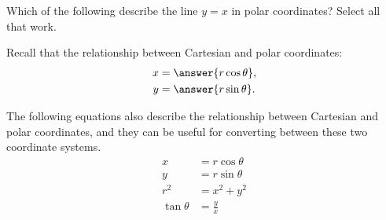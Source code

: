 \documentclass{ximera}
\begin{document}
\begin{example}
Which of the following describe the line $y=x$ in polar coordinates? Select all that work.
\begin{selectAll}
\end{selectAll}

\end{example}

Recall that the relationship between Cartesian and polar coordinates:
\begin{align*}
x &= \answer{r\cos\theta},\\
y &= \answer{r\sin\theta}.
\end{align*}

The following equations also describe the relationship between Cartesian and polar coordinates, and they can be useful for converting between these two coordinate systems.
\begin{align*}
x &= r\cos\theta\\
y &= r\sin\theta\\
r^2 &= x^2 +y^2\\
\tan\theta &= \frac{y}{x}
\end{align*}
\end{document}

